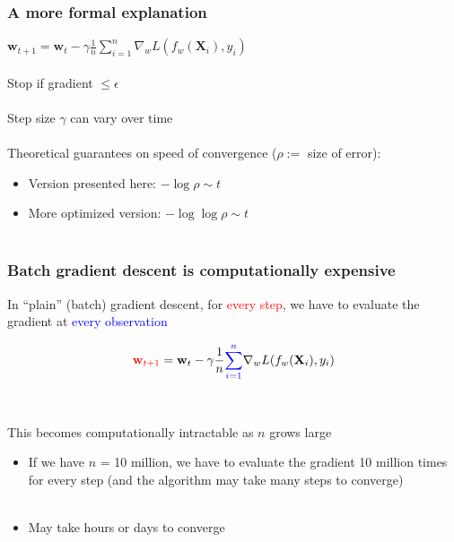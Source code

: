 \documentclass{beamer}
\begin{document}
\begin{frame}
	\frametitle{A more formal explanation}

	$\mathbf{w}_{t+1} = \mathbf{w}_t - \gamma \frac{1}{n}\sum_{i=1}^n
	\nabla_w L(f_w(\mathbf{X}_i), y_i)$ \\~\\

	Stop if gradient $\leq \epsilon$ \\~\\

	Step size $\gamma$ can vary over time \\~\\

	Theoretical guarantees on speed of convergence ($\rho :=$ size of error):
	\begin{itemize}
		\item Version presented here: $ - \log \rho \sim t$
		\item More optimized version: $ - \log \log \rho \sim t$ \\~\\
	\end{itemize}
	
\end{frame}

\begin{frame}
	\frametitle{Batch gradient descent is computationally expensive}
	In ``plain'' (batch) gradient descent, for \textcolor{red}{every step}, 
	we have to evaluate the gradient at \textcolor{blue} {every observation}

	$$
	\textcolor{red}{\mathbf{w}_{t+1}} = \mathbf{w}_t - \gamma \frac{1}{n}
	\textcolor{blue}{\sum_{i=1}^n}
	\nabla_w L(f_w(\mathbf{X}_i), y_i)
	$$\\~\\

	This becomes computationally intractable as $n$ grows large 
	\begin{itemize}
		\item \small If we have $n$ = 10 million, we have to evaluate the
			gradient 10 million times for every step (and the
			algorithm may take many steps to converge)\\~\\
		\item \small May take hours or days to converge \\~\\
	\end{itemize}
\end{frame}
\end{document}
